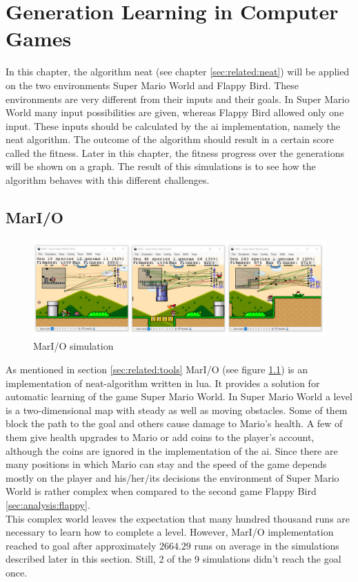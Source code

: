 %
\chapter{Generation Learning in Computer Games}
\label{sec:analysis}

In this chapter, the algorithm \gls{neat} (see chapter \ref{sec:related:neat}) will be applied on the two environments Super Mario World and Flappy Bird. These environments are very different from their inputs and their goals. In Super Mario World many input possibilities are given, whereas Flappy Bird allowed only one input. These inputs should be calculated by the \gls{ai} implementation, namely the \gls{neat} algorithm. The outcome of the algorithm should result in a certain score called the fitness. Later in this chapter, the fitness progress over the generations will be shown on a graph. The result of this simulations is to see how the algorithm behaves with this different challenges.

	\section{MarI/O}
		\label{sec:analysis:mario}
		
		\begin{figure}[h]
			\centering
			\includegraphics[width=1\textwidth]{graphics/mario/mario3}
			\caption{MarI/O simulation}
			\label{fig:mario}
		\end{figure}
		As mentioned in section \ref{sec:related:tools} MarI/O (see figure \ref{fig:mario}) is an implementation of \gls{neat}-algorithm written in \gls{lua}. It provides a solution for automatic learning of the game Super Mario World. In Super Mario World a level is a two-dimensional map with steady as well as moving obstacles.
		Some of them block the path to the goal and others cause damage to Mario's health. A few of them give health upgrades to Mario or add coins to the player's account, although the coins are ignored in the implementation of the \gls{ai}. Since there are many positions in which Mario can stay and the speed of the game depends mostly on the player and his/her/its decisions the environment of Super Mario World is rather complex when compared to the second game Flappy Bird \ref{sec:analysis:flappy}.\\
		This complex world leaves the expectation that many hundred thousand runs are necessary to learn how to complete a level. However, MarI/O implementation reached to goal after approximately $2664.29$ runs on average in the simulations described later in this section. Still, 2 of the 9 simulations didn't reach the goal once.
		

